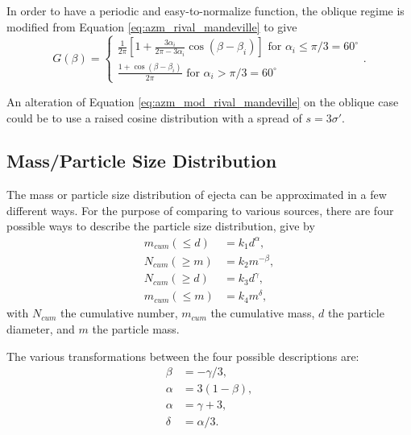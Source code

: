 \documentclass{article}
\begin{document}
 In order to have a periodic and easy-to-normalize function, the oblique regime is modified from Equation \eqref{eq:azm_rival_mandeville} to give
\begin{equation}\label{eq:azm_mod_rival_mandeville}
G(\beta) =
\begin{cases}
\frac{1}{2\pi}\left[1+\frac{3\alpha_i}{2\pi - 3\alpha_i}\cos(\beta-\beta_i)\right] \text{  for $\alpha_i\le \pi/3 = 60^\circ$}\\
\frac{1 + \cos(\beta-\beta_i)}{2\pi}
\text{  for $\alpha_i > \pi/3 = 60^\circ$}
\end{cases}.
\end{equation}

An alteration of Equation \eqref{eq:azm_mod_rival_mandeville} on the oblique case could be to use a raised cosine distribution with a spread of $ s = 3\sigma'$.




\subsection{Mass/Particle Size Distribution}\label{ssec:Mass/Particle Size Distribution}

The mass or particle size distribution of ejecta can be approximated in a few different ways. For the purpose of comparing to various sources, there are four possible ways to describe the particle size distribution, give by \citep{koschny2001impacts_mass}
\begin{align}
m_{cum}(\le d) &= k_1 d^\alpha,\label{eq:KG01 m_cum d}\\
N_{cum}(\ge m) &= k_2 m^{-\beta},\label{eq:KG01 N_cum m}\\
N_{cum}(\ge d) &= k_3 d^\gamma,\label{eq:KG01 N_cum d}\\
m_{cum}(\le m) &= k_4 m^\delta,\label{eq:KG01 m_cum m}
\end{align}
with $N_{cum}$ the cumulative number, $m_{cum}$ the cumulative mass, $d$ the particle diameter, and $m$ the particle mass.

The various transformations between the four possible descriptions are:
\begin{align}
\beta &= -\gamma/3,\\
\alpha &= 3(1-\beta),\\
\alpha &= \gamma + 3,\\
\delta &= \alpha/3.
\end{align}
\end{document}
